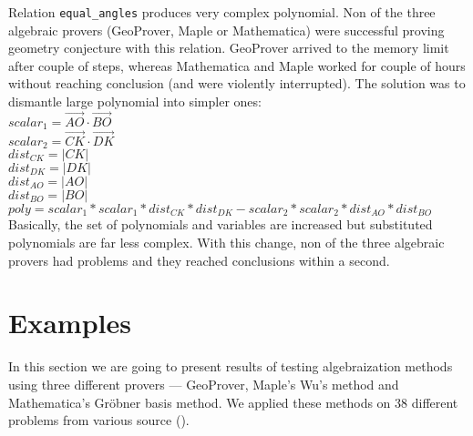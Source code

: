 \documentclass[final,1p,times,authoryear]{elsarticle}
\begin{document}
Relation {\tt equal\_angles} produces very complex polynomial. Non of
the three algebraic provers (GeoProver, Maple or Mathematica) were
successful proving geometry conjecture with this relation. GeoProver
arrived to the memory limit after couple of steps, whereas Mathematica
and Maple worked for couple of hours without reaching conclusion (and
were violently interrupted). The solution was to dismantle large
polynomial into simpler ones: \\
$scalar_1 = \overrightarrow{AO}\cdot\overrightarrow{BO}$ \\
$scalar_2 = \overrightarrow{CK}\cdot\overrightarrow{DK}$ \\
$dist_{CK} = |CK|$ \\
$dist_{DK} = |DK|$ \\
$dist_{AO} = |AO|$ \\
$dist_{BO} = |BO|$ \\
$poly = scalar_1 * scalar_1 * dist_{CK} * dist_{DK} - scalar_2 * scalar_2 * dist_{AO} * dist_{BO}$ \\

Basically, the set of polynomials and variables are increased but
substituted polynomials are far less complex. With this change, non of
the three algebraic provers had problems and they reached conclusions
within a second.
\section{Examples}

In this section we are going to present results of testing
algebraization methods using three different provers --- GeoProver,
Maple's Wu's method and Mathematica's Gr\"obner basis method. We
applied these methods on 38 different problems from various source
(\cite{janicic1997zbirka, shao2016challenging, arhzbirka, kinknjiga}).
\end{document}
